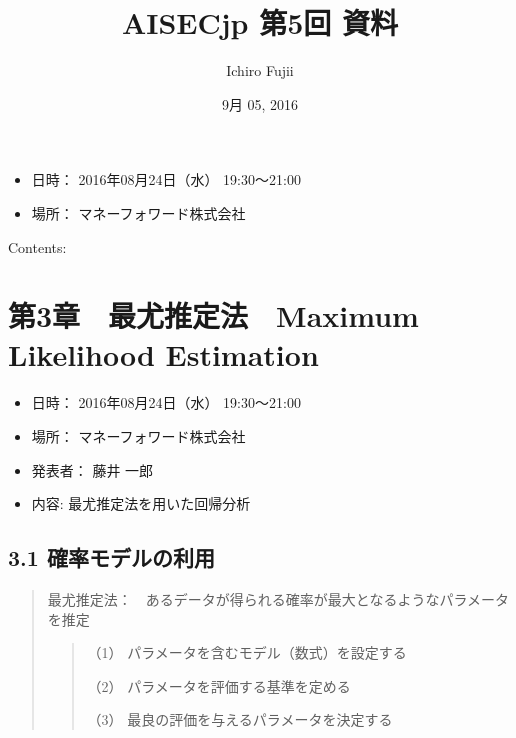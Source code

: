 \documentclass[letterpaper,10pt,dvipdfmx]{sphinxmanual}
\title{AISECjp 第5回 資料}
\date{9月 05, 2016}
\author{Ichiro Fujii}
\begin{document}
\maketitle
\tableofcontents
{}\label{index::doc}

\begin{itemize}
\item {} 
日時： 2016年08月24日（水） 19:30～21:00

\item {} 
場所： マネーフォワード株式会社

\end{itemize}

Contents:


\chapter{第3章　最尤推定法　Maximum Likelihood Estimation}
\label{Chapter_3_MLE:maximum-likelihood-estimation}\label{Chapter_3_MLE:aisecjp-5-documentation}\label{Chapter_3_MLE::doc}\begin{itemize}
\item {} 
日時： 2016年08月24日（水） 19:30～21:00

\item {} 
場所： マネーフォワード株式会社

\item {} 
発表者： 藤井 一郎

\item {} 
内容: 最尤推定法を用いた回帰分析

\end{itemize}


\section{3.1 確率モデルの利用}
\label{Chapter_3_MLE:id1}\begin{quote}

最尤推定法：　あるデータが得られる確率が最大となるようなパラメータを推定
\begin{quote}

（1） パラメータを含むモデル（数式）を設定する

（2） パラメータを評価する基準を定める

（3） 最良の評価を与えるパラメータを決定する
\end{quote}
\end{quote}
\end{document}
